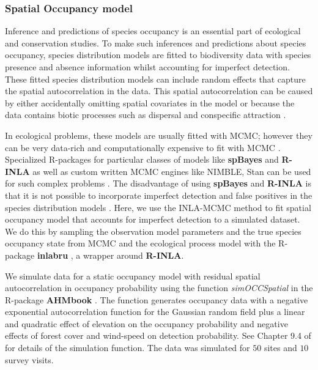 \documentclass[
]{article}
\begin{document}
\hypertarget{spatial-occupancy-model}{%
\subsubsection{\texorpdfstring{Spatial Occupancy model
\label{spatialOccupancyModel}}{Spatial Occupancy model }}\label{spatial-occupancy-model}}

Inference and predictions of species occupancy is an essential part of
ecological and conservation studies. To make such inferences and
predictions about species occupancy, species distribution models are
fitted to biodiversity data with species presence and absence
information whilst accounting for imperfect detection. These fitted
species distribution models can include random effects that capture the
spatial autocorrelation in the data. This spatial autocorrelation can be
caused by either accidentally omitting spatial covariates in the model
or because the data contains biotic processes such as dispersal and
conspecific attraction \citep{kery2020applied}.

In ecological problems, these models are usually fitted with MCMC;
however they can be very data-rich and computationally expensive to fit
with MCMC \citep{kery2020applied}. Specialized R-packages for particular
classes of models like \textbf{spBayes} \citep{spBayes} and
\textbf{R-INLA} as well as custom written MCMC engines like NIMBLE, Stan
\citep{carpenter2017stan} can be used for such complex problems
\citep{kery2015applied}. The disadvantage of using \textbf{spBayes} and
\textbf{R-INLA} is that it is not possible to incorporate imperfect
detection and false positives in the species distribution models
\citep{kery2020applied}. Here, we use the INLA-MCMC method to fit
spatial occupancy model that accounts for imperfect detection to a
simulated dataset. We do this by sampling the observation model
parameters and the true species occupancy state from MCMC and the
ecological process model with the R-package \textbf{inlabru}
\citep{bachl2019inlabru}, a wrapper around \textbf{R-INLA}.

We simulate data for a static occupancy model with residual spatial
autocorrelation in occupancy probability using the function
\textit{simOCCSpatial} in the R-package \textbf{AHMbook}
\citep{ahmbook}. The function generates occupancy data with a negative
exponential autocorrelation function for the Gaussian random field plus
a linear and quadratic effect of elevation on the occupancy probability
and negative effects of forest cover and wind-speed on detection
probability. See Chapter 9.4 of \citet{kery2020applied} for details of
the simulation function. The data was simulated for \(50\) sites and
\(10\) survey visits.
\end{document}

